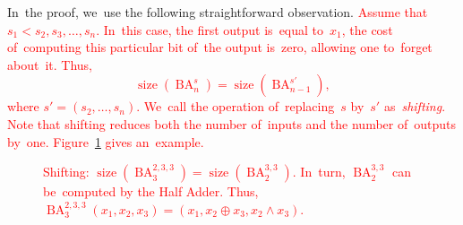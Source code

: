 \documentclass[a4paper, UKenglish, cleveref, autoref,  thm-restate]{lipics-v2021}
\DeclareMathOperator{\BA}{BA}
\DeclareMathOperator{\size}{size}
\begin{document}
    In~the proof, we~use the following straightforward observation.
    \textcolor{red}{Assume that $s_1<s_2,s_3, \dotsc, s_n$.
    In~this case, the first output is~equal to~$x_1$,
    the cost of~computing this particular bit of~the output is~zero,
    allowing one to~forget about~it. Thus,
    \[\operatorname{size}(\BA^s_n)=\operatorname{size}(\BA^{s'}_{n-1}),\]
    where $s'=(s_2,\dotsc, s_n)$. We~call the operation 
    of~replacing~$s$ by~$s'$
    as~\emph{shifting}. Note that shifting reduces both the number of~inputs and the number of~outputs by~one. Figure~\ref{figure:shifting} gives an~example.}

    \begin{figure}[ht]
        \begin{center}
        \end{center}
        \caption{\textcolor{red}{Shifting: $\size(\BA_3^{2, 3, 3})=\size(\BA_2^{3, 3})$. In~turn, $\BA_2^{3, 3}$ can be~computed by the Half Adder. Thus, $\BA_3^{2, 3, 3}(x_1, x_2, x_3)=(x_1, x_2 \oplus x_3, x_2 \land x_3)$.}}
        \label{figure:shifting}
    \end{figure}
\end{document}
